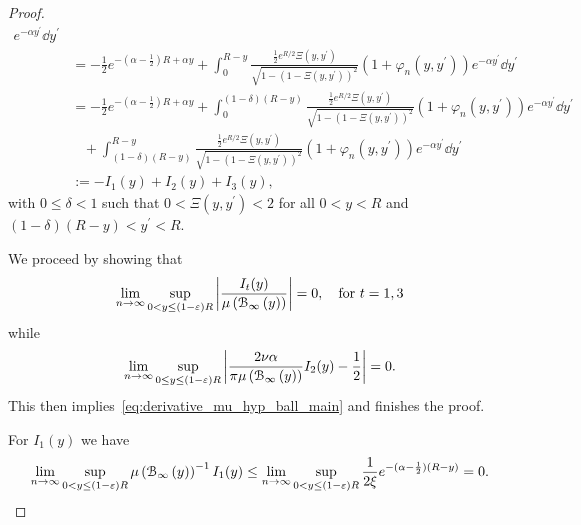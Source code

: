 \begin{appendices}
\begin{proof}
\begin{align*}
		 e^{-\alpha y^\prime} \dd y^\prime\\
	&= -\frac{1}{2}e^{-(\alpha-\frac{1}{2})R + \alpha y} + \int_0^{R- y} \frac{ \frac{1}{2}e^{R/2} \Xi(y,y^\prime)}{\sqrt{1 - \left(1 - \Xi(y,y^\prime)\right)^2}}
		\left(1 + \varphi_n(y,y^\prime)\right) e^{-\alpha y^\prime} \dd y^\prime\\
	&= -\frac{1}{2}e^{-(\alpha-\frac{1}{2})R + \alpha y}  + \int_0^{(1-\delta)(R- y)} \frac{ \frac{1}{2}e^{R/2} \Xi(y,y^\prime)}
		{\sqrt{1 - \left(1 - \Xi(y,y^\prime)\right)^2}}
		\left(1 + \varphi_n(y,y^\prime)\right) e^{-\alpha y^\prime} \dd y^\prime\\
	&\hspace{10pt}+ \int_{(1-\delta)(R- y)}^{R - y} \frac{ \frac{1}{2}e^{R/2} \Xi(y,y^\prime)}
			{\sqrt{1 - \left(1 - \Xi(y,y^\prime)\right)^2}}
			\left(1 + \varphi_n(y,y^\prime)\right) e^{-\alpha y^\prime} \dd y^\prime\\
	&:= -I_1(y) + I_2(y) + I_3(y),
\end{align*}
with $0 \le \delta < 1$ such that $0 < \Xi(y,y^\prime) < 2$ for all $0 < y < R$ and $(1-\delta)(R-y) < y^\prime < R$.

We proceed by showing that
\begin{equation}\label{eq:derivative_hyp_ball_error_1}
	\lim_{n \to \infty} \sup_{0 < y \le (1-\varepsilon)R} \left|\frac{I_t(y)}{\mu\left({\mathcal B}_{\infty}\left(y\right)\right)}\right| 
	= 0, \quad \text{for } t = 1,3
\end{equation}
while
\begin{equation}\label{eq:derivative_hyp_ball_main_part}
	\lim_{n \to \infty} \sup_{0 \le y \le (1-\varepsilon)R} \left|\frac{2\nu \alpha}{\pi \mu\left({\mathcal B}_{\infty}\left(y\right)\right)} I_2(y) - \frac{1}{2}\right| = 0.
\end{equation}
This then implies~\eqref{eq:derivative_mu_hyp_ball_main} and finishes the proof.

For $I_1(y)$ we have 
\[
	\lim_{n \to \infty} \sup_{0 < y \le (1-\varepsilon)R} \mu\left({\mathcal B}_{\infty}\left(y\right)\right)^{-1} I_1(y) 
	\le \lim_{n \to \infty} \sup_{0 < y \le (1-\varepsilon)R} \frac{1}{2\xi} e^{-(\alpha - \frac{1}{2})(R - y)} = 0.
\]


\end{proof}
\end{appendices}
